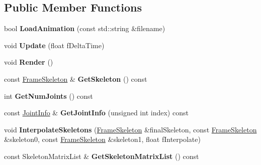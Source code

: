 \subsection*{Public Member Functions}
\begin{DoxyCompactItemize}
\item 
bool {\bfseries Load\+Animation} (const std\+::string \&filename)\hypertarget{class_m_d5_animation_afccfff8962a0efc3cf52049a6b9e7a82}{}\label{class_m_d5_animation_afccfff8962a0efc3cf52049a6b9e7a82}

\item 
void {\bfseries Update} (float f\+Delta\+Time)\hypertarget{class_m_d5_animation_ae150a53834deb176c35ac63f7913c4e5}{}\label{class_m_d5_animation_ae150a53834deb176c35ac63f7913c4e5}

\item 
void {\bfseries Render} ()\hypertarget{class_m_d5_animation_a1f6cad453b4750412e0f708a1cc5122b}{}\label{class_m_d5_animation_a1f6cad453b4750412e0f708a1cc5122b}

\item 
const \hyperlink{struct_m_d5_animation_1_1_frame_skeleton}{Frame\+Skeleton} \& {\bfseries Get\+Skeleton} () const \hypertarget{class_m_d5_animation_a00e9899126768fb7bbbb96e65a51fed9}{}\label{class_m_d5_animation_a00e9899126768fb7bbbb96e65a51fed9}

\item 
int {\bfseries Get\+Num\+Joints} () const \hypertarget{class_m_d5_animation_a0ee75478e9a12fb1ddaf44e98bf0d517}{}\label{class_m_d5_animation_a0ee75478e9a12fb1ddaf44e98bf0d517}

\item 
const \hyperlink{struct_m_d5_animation_1_1_joint_info}{Joint\+Info} \& {\bfseries Get\+Joint\+Info} (unsigned int index) const \hypertarget{class_m_d5_animation_a6c786c02b5e01aac7395b0f21efbf792}{}\label{class_m_d5_animation_a6c786c02b5e01aac7395b0f21efbf792}

\item 
void {\bfseries Interpolate\+Skeletons} (\hyperlink{struct_m_d5_animation_1_1_frame_skeleton}{Frame\+Skeleton} \&final\+Skeleton, const \hyperlink{struct_m_d5_animation_1_1_frame_skeleton}{Frame\+Skeleton} \&skeleton0, const \hyperlink{struct_m_d5_animation_1_1_frame_skeleton}{Frame\+Skeleton} \&skeleton1, float f\+Interpolate)\hypertarget{class_m_d5_animation_acb2fcc23fdab580e1496a7c20f236a7f}{}\label{class_m_d5_animation_acb2fcc23fdab580e1496a7c20f236a7f}

\item 
const Skeleton\+Matrix\+List \& {\bfseries Get\+Skeleton\+Matrix\+List} () const \hypertarget{class_m_d5_animation_a463069288d498da1db25afaed3d8e70b}{}\label{class_m_d5_animation_a463069288d498da1db25afaed3d8e70b}

\end{DoxyCompactItemize}
